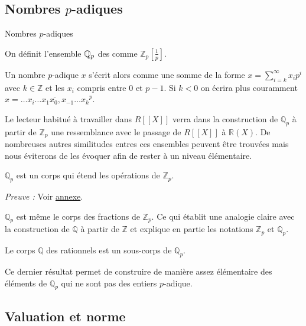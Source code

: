 \subsection{Nombres \texorpdfstring{$p$}{p}-adiques}

\begin{definition} Nombres $p$-adiques 


	On définit l'ensemble $\mathbb{Q}_p$ des  comme $\mathbb{Z}_p \left[ \frac{1}{p} \right] $.
\end{definition}

Un nombre $p$-adique $x$ s'écrit alors comme une somme de la forme $x = \sum \limits_{i=k}^{\infty} x_{i} p^i$ avec $k \in \mathbb{Z}$ et les $x_{i}$ compris entre $0$ et $p-1$. Si $k<0$ on écrira plus couramment $x = \overline{\ldots x_i \ldots x_1 x_0 , x_{-1}\ldots x_{k}}^p$.

\begin{remarque}
Le lecteur habitué à travailler dans $R[[X]]$ verra dans la construction de $\mathbb{Q}_{p} $ à partir de $\mathbb{Z}_p$ une ressemblance avec le passage de $R[[X]]$ à $\mathbb{R}\left( X \right) $. De nombreuses autres similitudes entres ces ensembles peuvent être trouvées mais nous éviterons de les évoquer afin de rester à un niveau élémentaire.

\end{remarque}
\begin{propriete}
\label{qpcorps} 
	$\mathbb{Q}_{p}$ est un corps qui étend les opérations de $\mathbb{Z}_p$.
\end{propriete}
\textit{Preuve :} Voir \hyperlink{qpcorpspreuve}{annexe}.   

\begin{remarque}
	$\mathbb{Q}_{p}$ est même le corps des fractions de $\mathbb{Z}_p$. Ce qui établit une analogie claire avec la construction de $\mathbb{Q}$ à partir de $\mathbb{Z}$ et explique en partie les notations $\mathbb{Z}_p$ et $\mathbb{Q}_{p} $. 
\end{remarque}
\begin{corollaire}
	Le corps $\mathbb{Q}$ des rationnels est un sous-corps de $\mathbb{Q}_{p} $.
\end{corollaire}
Ce dernier résultat permet de construire de manière assez élémentaire des éléments de $\mathbb{Q}_{p}$ qui ne sont pas des entiers $p$-adique.

\subsection{Valuation et norme}

